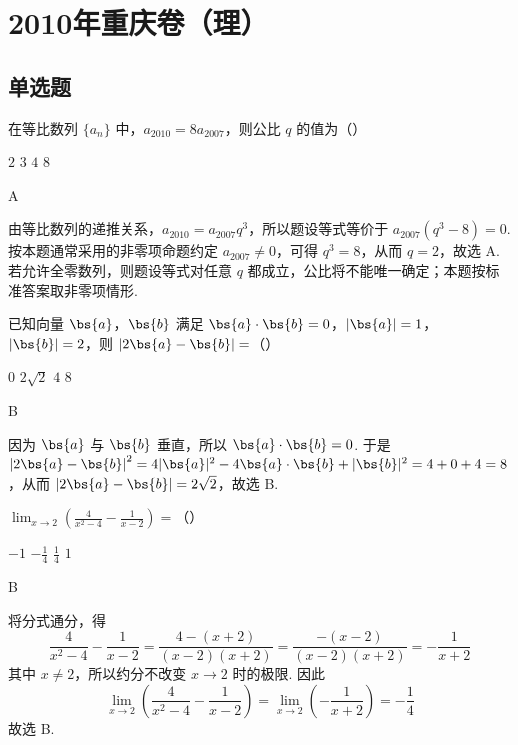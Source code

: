 \chapter{2010年重庆卷（理）}

\section{单选题}

\begin{problem}
在等比数列 \(\{a_{n}\}\) 中，\(a_{2010} = 8a_{2007}\)，则公比 \(q\) 的值为（\quad）

\choices
    {\(2\)}
    {\(3\)}
    {\(4\)}
    {\(8\)}

\begin{answer}
A
\end{answer}

\begin{solution}
由等比数列的递推关系，\(a_{2010}=a_{2007}q^3\)，所以题设等式等价于
\(a_{2007}(q^3-8)=0\). 按本题通常采用的非零项命题约定 \(a_{2007}\ne0\)，可得 \(q^3=8\)，从而 \(q=2\)，故选 A. 若允许全零数列，则题设等式对任意 \(q\) 都成立，公比将不能唯一确定；本题按标准答案取非零项情形.
\end{solution}
\end{problem}

\begin{problem}
已知向量 \(\bs{a}\)，\(\bs{b}\) 满足 \(\bs{a} \cdot \bs{b} = 0\)，\(|\bs{a}| = 1\)，\(|\bs{b}| = 2\)，则 \(|2\bs{a} - \bs{b}| =\)（\quad）

\choices
    {\(0\)}
    {\( 2\sqrt{2} \)}
    {\(4\)}
    {\(8\)}

\begin{answer}
B
\end{answer}

\begin{solution}
因为 \(\bs{a}\) 与 \(\bs{b}\) 垂直，所以 \(\bs{a}\cdot\bs{b}=0\). 于是 \(\left|2\bs{a}-\bs{b}\right|^2=4|\bs{a}|^2-4\bs{a}\cdot\bs{b}+|\bs{b}|^2=4+0+4=8\)，从而 \(\left|2\bs{a}-\bs{b}\right|=2\sqrt{2}\)，故选 B.
\end{solution}
\end{problem}

\begin{problem}
\(\displaystyle\lim_{x\to 2}\left(\frac{4}{x^2 - 4} -\frac{1}{x - 2}\right) =\)（\quad）

\choices
    {\(-1\)}
    {\( -\frac{1}{4} \)}
    {\( \frac{1}{4} \)}
    {\(1\)}

\begin{answer}
B
\end{answer}

\begin{solution}
将分式通分，得
\[
\frac{4}{x^2-4}-\frac{1}{x-2}=\frac{4-(x+2)}{(x-2)(x+2)}
=\frac{-(x-2)}{(x-2)(x+2)}=-\frac{1}{x+2}
\]
其中 \(x\ne2\)，所以约分不改变 \(x\to2\) 时的极限.
因此
\[
\displaystyle\lim_{x\to2}\left(\frac{4}{x^2-4}-\frac{1}{x-2}\right)=\lim_{x\to2}\left(-\frac{1}{x+2}\right)=-\frac14
\]
故选 B.
\end{solution}
\end{problem}


